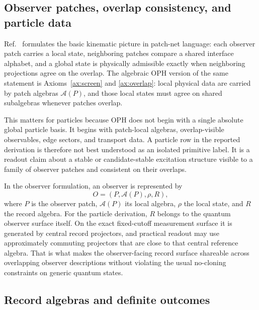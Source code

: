 \documentclass[11pt]{article}
\begin{document}
\subsection{Observer patches, overlap consistency, and particle data}

Ref.~\cite{ophconsensus} formulates the basic kinematic picture in patch-net language: each observer
patch carries a local state, neighboring patches compare a shared interface alphabet, and a
global state is physically admissible exactly when neighboring projections agree on the overlap.
The algebraic OPH version of the same statement is Axioms~\ref{ax:screen} and
\ref{ax:overlap}: local physical data are carried by patch algebras \(\mathcal A(P)\), and those local
states must agree on shared subalgebras whenever patches overlap.

This matters for particles because OPH does not begin with a single absolute global particle
basis. It begins with patch-local algebras, overlap-visible observables, edge sectors, and
transport data. A particle row in the reported derivation is therefore not best
understood as an isolated primitive label. It is a readout claim about a stable or
candidate-stable excitation structure visible to a family of observer patches and consistent on
their overlaps.

In the observer formulation, an observer is represented by
\[
O=(P,\mathcal A(P),\rho,R),
\]
where \(P\) is the observer patch, \(\mathcal A(P)\) its local algebra, \(\rho\) the local
state, and \(R\) the record algebra. For the particle derivation, \(R\) belongs to the quantum
observer surface itself. On the exact fixed-cutoff measurement
surface it is generated by central record projectors, and practical readout may use
approximately commuting projectors that are close to that central reference algebra. That is what
makes the observer-facing record surface shareable across overlapping observer descriptions
without violating the usual no-cloning constraints on generic quantum states.

\subsection{Record algebras and definite outcomes}
\end{document}

